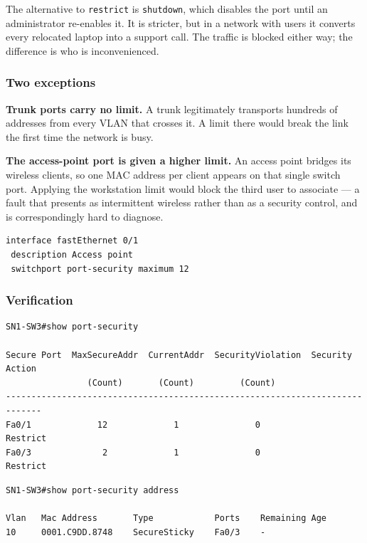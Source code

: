 \documentclass[12pt,a4paper]{article}
\begin{document}
The alternative to \texttt{restrict} is \texttt{shutdown}, which disables the
port until an administrator re-enables it. It is stricter, but in a network
with users it converts every relocated laptop into a support call. The traffic
is blocked either way; the difference is who is inconvenienced.

\subsubsection*{Two exceptions}

\textbf{Trunk ports carry no limit.} A trunk legitimately transports hundreds of
addresses from every VLAN that crosses it. A limit there would break the link
the first time the network is busy.

\textbf{The access-point port is given a higher limit.} An access point bridges
its wireless clients, so one MAC address per client appears on that single
switch port. Applying the workstation limit would block the third user to
associate --- a fault that presents as intermittent wireless rather than as a
security control, and is correspondingly hard to diagnose.

\begin{lstlisting}
interface fastEthernet 0/1
 description Access point
 switchport port-security maximum 12
\end{lstlisting}

\subsubsection*{Verification}

\begin{lstlisting}
SN1-SW3#show port-security

Secure Port  MaxSecureAddr  CurrentAddr  SecurityViolation  Security Action
                (Count)       (Count)         (Count)
-----------------------------------------------------------------------------
Fa0/1             12             1               0             Restrict
Fa0/3              2             1               0             Restrict
\end{lstlisting}

\begin{lstlisting}
SN1-SW3#show port-security address

Vlan   Mac Address       Type            Ports    Remaining Age
10     0001.C9DD.8748    SecureSticky    Fa0/3    -
\end{lstlisting}
\end{document}
